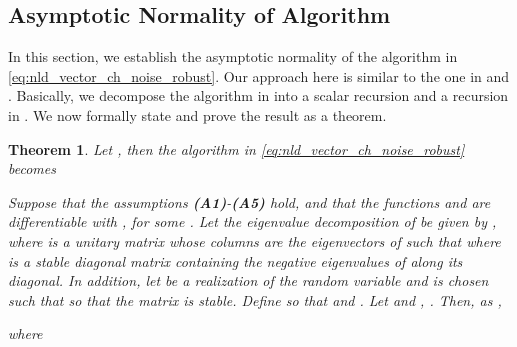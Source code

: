 \documentclass[onecolumn, draft, 12pt]{IEEEtran}
\newtheorem{thm}{Theorem}
\begin{document}
\subsection{Asymptotic Normality of  Algorithm}\label{subsec:asym_norm_nld_robust} 

In this section, we establish the asymptotic normality of the  algorithm in \eqref{eq:nld_vector_ch_noise_robust}. Our approach here is similar to the one in \cite{MinyiHuang2008} and \cite{dastep2013}. Basically, we decompose the  algorithm in  into a scalar recursion and a recursion in . We now formally state and prove the result as a theorem. 

\begin{thm} \label{asym_norm_nld_lemma_robust}
Let , then the  algorithm in \eqref{eq:nld_vector_ch_noise_robust} becomes

Suppose that the assumptions \textbf{(A1)}-\textbf{(A5)} hold, and that the functions  and  are differentiable with , for some . Let the eigenvalue decomposition of  be given by , where  is a unitary matrix whose columns are the eigenvectors of  such that 
 where  is a stable diagonal matrix containing the  negative eigenvalues of  along its diagonal. In addition, let  be a realization of the random variable  and  is chosen such that  so that the matrix  is stable. Define  so that  and . Let  and , . Then, as ,


where 
\end{thm}
\end{document}
